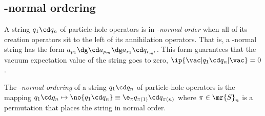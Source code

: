 \documentclass[11pt,fleqn]{article}
\numberwithin{equation}{section}
\begin{document}
\subsection{\vac-normal ordering}

\begin{dfn}
A string $q_1\cd q_n$ of particle-hole operators is in \textit{\vac-normal order} when all of its creation operators sit to the left of its annihilation operators.
That is, a \vac-normal string has the form $a_{p_1}\dg\cd a_{p_m}\dg a_{r_1}\cd q_{r_{m'}}$.
This form guarantees that the vacuum expectation value of the string goes to zero, $\ip{\vac|q_1\cd q_n|\vac}=0$.
\end{dfn}

\begin{dfn}
The \textit{\vac-normal ordering} of a string $q_1\cd q_n$ of particle-hole operators is the mapping $q_1\cd q_n\mapsto\no{q_1\cd q_n}\equiv\e_{\pi}q_{\pi(1)}\cd q_{\pi(n)}$ where $\pi\in\mr{S}_n$ is a permutation that places the string in normal order.
\end{dfn}
\end{document}
